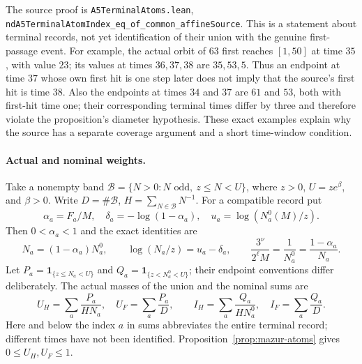 \documentclass[11pt]{article}
\theoremstyle{remark}\newtheorem{remark}[proposition]{Remark}
\begin{document}
The source proof is
\texttt{A5TerminalAtoms.lean},
\texttt{ndA5TerminalAtomIndex\_eq\_of\_common\_affineSource}.
This is a statement about terminal records, not yet identification of
their union with the genuine first-passage event.
For example, the actual orbit of $63$ first reaches $[1,50]$ at
time $35$, with value $23$; its values at times $36,37,38$ are
$35,53,5$. Thus an endpoint at time $37$ whose own first hit is one
step later does not imply that the source's first hit is time $38$.
Also the endpoints at times $34$ and $37$ are $61$ and $53$,
both with first-hit time one; their corresponding terminal times differ
by three and therefore violate the proposition's diameter hypothesis.
These exact examples explain why the source has a separate coverage
argument and a short time-window condition.

\paragraph{Actual and nominal weights.}
Take a nonempty band
$\mathcal B=\{N>0:N\text{ odd},\ z\le N<U\}$, where
$z>0$, $U=ze^\beta$, and $\beta>0$.
Write $D=\#\mathcal B$, $H=\sum_{N\in\mathcal B}N^{-1}$.
For a compatible record put
\[
 \alpha_a=F_a/M,\quad
 \delta_a=-\log(1-\alpha_a),\quad
 u_a=\log(N_a^0(M)/z).
\]
Then $0<\alpha_a<1$ and the exact identities are
\[
 N_a=(1-\alpha_a)N_a^0,\qquad
 \log(N_a/z)=u_a-\delta_a,\qquad
 \frac{3^\nu}{2^\ell M}=\frac1{N_a^0}
                  =\frac{1-\alpha_a}{N_a}.
 \tag{*}
\]
Let $P_a=\mathbf1_{\{z\le N_a<U\}}$ and
$Q_a=\mathbf1_{\{z<N_a^0<U\}}$; their endpoint conventions differ
deliberately. The actual masses of the union and the nominal sums are
\[
 U_H=\sum_a\frac{P_a}{HN_a},\quad U_F=\sum_a\frac{P_a}{D},
 \qquad I_H=\sum_a\frac{Q_a}{HN_a^0},\quad I_F=\sum_a\frac{Q_a}{D}.
\]
Here and below the index $a$ in sums abbreviates the entire terminal
record; different times have not been identified.
Proposition~\ref{prop:mazur-atoms} gives $0\le U_H,U_F\le1$.
\end{document}
